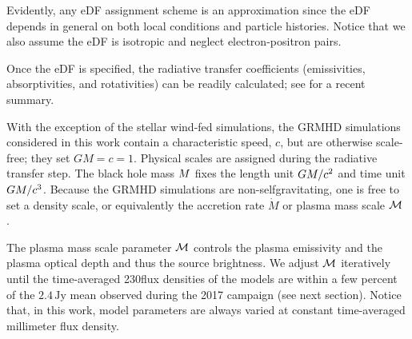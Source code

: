 Evidently, any eDF assignment scheme is an approximation since the eDF depends in general on both local conditions and particle histories.  Notice that we also assume the eDF is isotropic and neglect electron-positron pairs.

Once the eDF is specified, the radiative transfer coefficients (emissivities, absorptivities, and rotativities) can be readily calculated; see \cite{2021ApJ...921...17M} for a recent summary.



With the exception of the stellar wind-fed simulations, the GRMHD simulations considered in this work contain a characteristic speed, $c$, but are otherwise scale-free; they set $GM = c = 1$.
Physical scales are assigned during the radiative transfer step.
The black hole mass $M$ fixes the length unit $GM/c^2$ and time unit $GM/c^3$.
Because the GRMHD simulations are non-selfgravitating, one is free to set a density scale, or equivalently the accretion rate $\dot{M}$ or plasma mass scale $\mathcal{M}$ \citep[see, e.g.,][for a full discussion]{Wong_2022}.

The plasma mass scale parameter $\mathcal{M}$ controls the plasma emissivity and the plasma optical depth and thus the source brightness.  We adjust $\mathcal{M}$ iteratively until the time-averaged 230\GHz flux densities of the models are within a few percent of the $2.4\,\mathrm{Jy}$ mean observed during the 2017 campaign (see next section).  Notice that, in this work, model parameters are always varied at constant time-averaged millimeter flux density.


